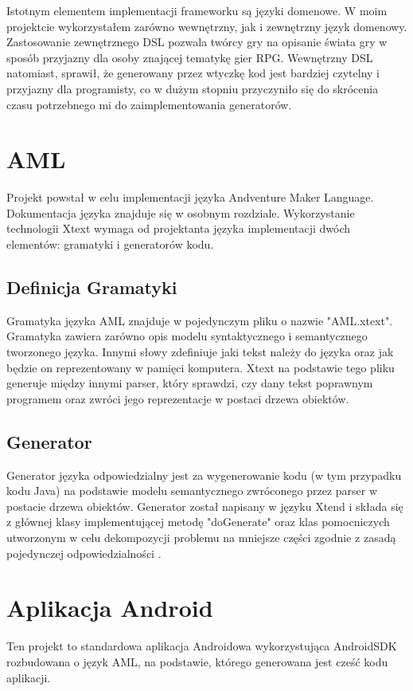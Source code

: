 \documentclass	{xmgr}
\begin{document}
Istotnym elementem implementacji frameworku są języki domenowe. W moim projektcie wykorzystałem zarówno wewnętrzny, jak i zewnętrzny język domenowy. Zastosowanie zewnętrznego DSL pozwala twórcy gry na opisanie świata gry w sposób przyjazny dla osoby znającej tematykę gier RPG. Wewnętrzny DSL natomiast, sprawił, że generowany przez wtyczkę kod jest bardziej czytelny i przyjazny dla programisty, co w dużym stopniu przyczyniło się do skrócenia czasu potrzebnego mi do zaimplementowania generatorów.

\section{AML} 
Projekt powstał w celu implementacji języka Andventure Maker Language. Dokumentacja języka znajduje się w osobnym rozdziale. Wykorzystanie technologii Xtext \cite{Xtext:2017:Doc} wymaga od projektanta języka implementacji dwóch elementów: gramatyki i generatorów kodu. 

\subsection{Definicja Gramatyki} 

Gramatyka języka AML znajduje w pojedynczym pliku o nazwie "AML.xtext". Gramatyka zawiera zarówno opis modelu syntaktycznego i semantycznego tworzonego języka. Innymi słowy zdefiniuje jaki tekst należy do języka oraz jak będzie on reprezentowany w pamięci komputera. Xtext na podstawie tego pliku generuje między innymi parser, który sprawdzi, czy dany tekst poprawnym programem oraz zwróci jego reprezentacje w postaci drzewa obiektów.

\subsection{Generator}
Generator języka odpowiedzialny jest za wygenerowanie kodu (w tym przypadku kodu Java) na podstawie modelu semantycznego zwróconego przez parser w postacie drzewa obiektów. Generator został napisany w języku Xtend i składa się z głównej klasy implementującej metodę "doGenerate" oraz klas pomocniczych utworzonym w celu dekompozycji problemu na mniejsze części zgodnie z zasadą pojedynczej odpowiedzialności \cite{CleanCode:1000}.

\section{Aplikacja Android}
Ten projekt to standardowa aplikacja Androidowa wykorzystująca AndroidSDK rozbudowana o język AML, na podstawie, którego generowana jest cześć kodu aplikacji.
\end{document}
